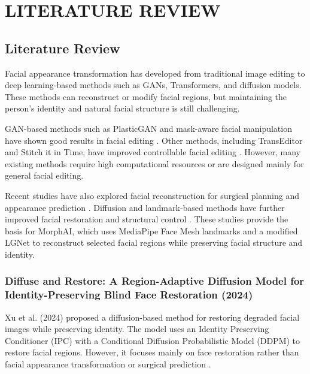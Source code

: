 \chapter{LITERATURE REVIEW}

\section{Literature Review}

\noindent Facial appearance transformation has developed from traditional image editing to deep learning-based methods such as GANs, Transformers, and diffusion models. These methods can reconstruct or modify facial regions, but maintaining the person's identity and natural facial structure is still challenging.

\noindent GAN-based methods such as PlasticGAN and mask-aware facial manipulation have shown good results in facial editing \cite{chandaliya2022plasticgan,sun2021maskaware}. Other methods, including TransEditor and Stitch it in Time, have improved controllable facial editing \cite{xu2022transeditor,tzaban2022stitch}. However, many existing methods require high computational resources or are designed mainly for general facial editing.

\noindent Recent studies have also explored facial reconstruction for surgical planning and appearance prediction \cite{fang2022acmt,bini2025facial}. Diffusion and landmark-based methods have further improved facial restoration and structural control \cite{xu2024diffuse,chen2024deepface}. These studies provide the basis for MorphAI, which uses MediaPipe Face Mesh landmarks and a modified LGNet to reconstruct selected facial regions while preserving facial structure and identity.



\subsection{Diffuse and Restore: A Region-Adaptive Diffusion Model for Identity-Preserving Blind Face Restoration (2024)}

Xu et al. (2024) proposed a diffusion-based method for restoring degraded facial images while preserving identity. The model uses an Identity Preserving Conditioner (IPC) with a Conditional Diffusion Probabilistic Model (DDPM) to restore facial regions. However, it focuses mainly on face restoration rather than facial appearance transformation or surgical prediction \cite{xu2024diffuse}.

